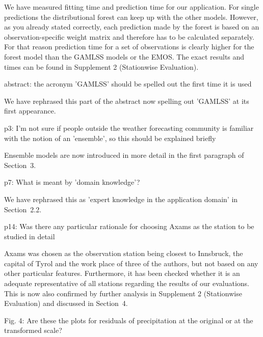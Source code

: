 \documentclass[american,foldmarks=false,noconfig]{uibklttr}
\newenvironment{review}{\fontshape{\itdefault}\fontseries{\bfdefault} \selectfont \smallskip}{\par}
\begin{document}
We have measured fitting time and prediction time for our 
application. For single predictions the distributional forest 
can keep up with the other models. However, as you already 
stated correctly, each prediction made by the forest is based 
on an observation-specific weight matrix and therefore has to 
be calculated separately. For that reason prediction time for a 
set of observations is clearly higher for the forest model than 
the GAMLSS models or the EMOS. The exact results and times can 
be found in Supplement 2 (Stationwise Evaluation).


\begin{review}
abstract: the acronym 'GAMLSS' should be spelled out the first 
time it is used
\end{review}

We have rephrased this part of the abstract now spelling out 'GAMLSS' at 
its first appearance.

\begin{review}
p3: I'm not sure if people outside the weather forecasting 
community is familiar with the notion of an 'ensemble', so 
this should be explained briefly
\end{review}

Ensemble models are now introduced in more detail in the
first paragraph of Section~3.


\begin{review}
p7: What is meant by 'domain knowledge'?
\end{review}

We have rephrased this as 'expert knowledge in the application domain'
in Section~2.2.


\begin{review}
p14: Was there any particular rationale for choosing Axams 
as the station to be studied in detail
\end{review}

Axams was chosen as the observation station being closest 
to Innsbruck, the capital of Tyrol and the work place of 
three of the authors, but not based on any other particular 
features. Furthermore, it has been checked whether it 
is an adequate representative of all stations regarding 
the results of our evaluations. This is now also 
confirmed by further analysis in Supplement 2 (Stationwise Evaluation) 
and discussed in Section~4.

\begin{review}
Fig. 4: Are these the plots for residuals of precipitation 
at the original or at the transformed scale?
\end{review}
\end{document}
